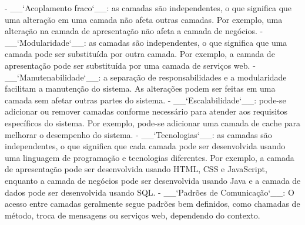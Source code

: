 - __`Acoplamento fraco`__: as camadas são independentes, o que significa que uma alteração em uma camada não afeta outras camadas. Por exemplo, uma alteração na camada de apresentação não afeta a camada de negócios.
- __`Modularidade`__: as camadas são independentes, o que significa que uma camada pode ser substituída por outra camada. Por exemplo, a camada de apresentação pode ser substituída por uma camada de serviços web.
- __`Manutenabilidade`__: a separação de responsabilidades e a modularidade facilitam a manutenção do sistema. As alterações podem ser feitas em uma camada sem afetar outras partes do sistema. 
- __`Escalabilidade`__: pode-se adicionar ou remover camadas conforme necessário para atender aos requisitos específicos do sistema. Por exemplo, pode-se adicionar uma camada de cache para melhorar o desempenho do sistema.
- __`Tecnologias`__: as camadas são independentes, o que significa que cada camada pode ser desenvolvida usando uma linguagem de programação e tecnologias diferentes. Por exemplo, a camada de apresentação pode ser desenvolvida usando HTML, CSS e JavaScript, enquanto a camada de negócios pode ser desenvolvida usando Java e a camada de dados pode ser desenvolvida usando SQL.
- __`Padrões de Comunicação`__: O acesso entre camadas geralmente segue padrões bem definidos, como chamadas de método, troca de mensagens ou serviços web, dependendo do contexto.